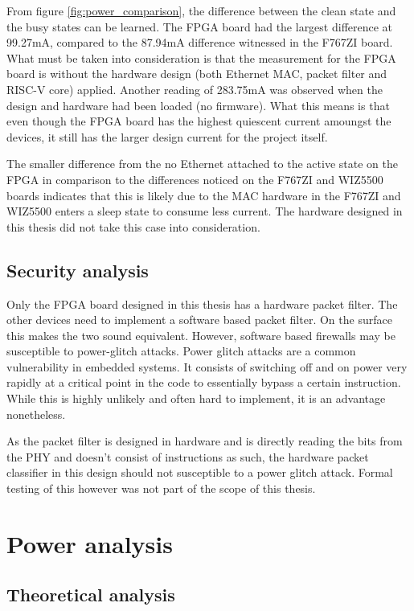 From figure \ref{fig:power_comparison}, the difference between the clean state and the busy states can be learned. The FPGA board had the largest difference at 99.27mA, compared to the 87.94mA difference witnessed in the F767ZI board. What must be taken into consideration is that the measurement for the FPGA board is without the hardware design (both Ethernet MAC, packet filter and RISC-V core) applied. Another reading of 283.75mA was observed when the design and hardware had been loaded (no firmware). What this means is that even though the FPGA board has the highest quiescent current amoungst the devices, it still has the larger design current for the project itself. 

The smaller difference from the no Ethernet attached to the active state on the FPGA in comparison to the differences noticed on the F767ZI and WIZ5500 boards indicates that this is likely due to the MAC hardware in the F767ZI and WIZ5500 enters a sleep state to consume less current. The hardware designed in this thesis did not take this case into consideration. 


\subsection{Security analysis}
Only the FPGA board designed in this thesis has a hardware packet filter. The other devices need to implement a software based packet filter. On the surface this makes the two sound equivalent. However, software based firewalls may be susceptible to power-glitch attacks. Power glitch attacks are a common vulnerability in embedded systems. It consists of switching off and on power very rapidly at a critical point in the code to essentially bypass a certain instruction. While this is highly unlikely and often hard to implement, it is an advantage nonetheless.  

As the packet filter is designed in hardware and is directly reading the bits from the PHY and doesn't consist of instructions as such, the hardware packet classifier in this design should not susceptible to a power glitch attack. Formal testing of this however was not part of the scope of this thesis.


\section{Power analysis}

\subsection{Theoretical analysis }

